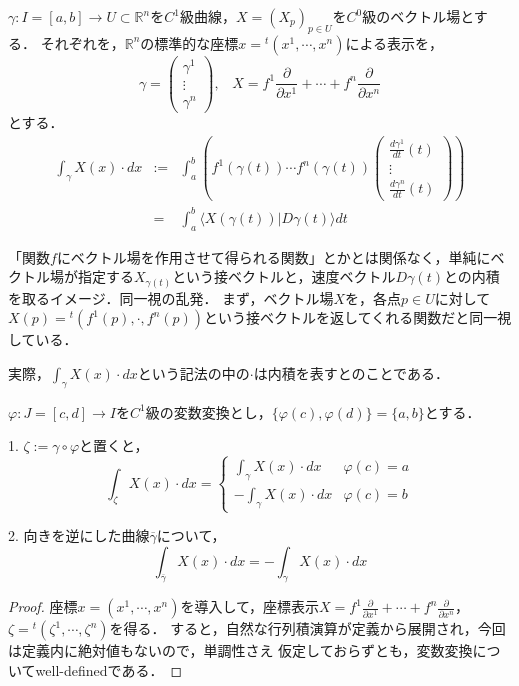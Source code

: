 \documentclass[uplatex, dvipdfmx]{jsreport}
\begin{document}
\begin{shadebox}\begin{definition}
    $\gamma:I=[a,b]\to U\subset\mathbb{R}^n$を$C^1$級曲線，$X=(X_p)_{p\in U}$を$C^0$級のベクトル場とする．
    それぞれを，$\mathbb{R}^n$の標準的な座標$x={}^t(x^1,\cdots,x^n)$による表示を，
    \[ \gamma = \left(\begin{array}{c}\gamma^1 \\ \vdots \\ \gamma^n\end{array}\right), \;\;\; X=f^1\frac{\partial }{\partial x^1}+\cdots +f^n\frac{\partial }{\partial x^n} \]
    とする．
    \begin{eqnarray*}
        \int_\gamma X(x)\cdot dx &:=& \int^b_a \left( f^1(\gamma (t))\cdots f^n(\gamma (t))\left(\begin{array}{c}\frac{d\gamma^1}{dt}(t) \\ \vdots \\ \frac{d\gamma^n}{dt}(t)\end{array}\right) \right) \\
            &=& \int^b_a \langle X(\gamma (t))|D\gamma (t)\rangle dt
    \end{eqnarray*}
\end{definition}\end{shadebox}
\begin{remark}
    「関数$f$にベクトル場を作用させて得られる関数」とかとは関係なく，単純にベクトル場が指定する$X_{\gamma(t)}$という接ベクトルと，速度ベクトル$D\gamma (t)$との内積を取るイメージ．同一視の乱発．
    まず，ベクトル場$X$を，各点$p\in U$に対して$X(p)={}^t(f^1(p),\cdot,f^n(p))$という接ベクトルを返してくれる関数だと同一視している．

    実際，$\int_\gamma X(x)\cdot dx$という記法の中の$\cdot$は内積を表すとのことである．
\end{remark}

\begin{proposition}
    $\varphi :J=[c,d]\to I$を$C^1$級の変数変換とし，$\{\varphi(c),\varphi(d)\}=\{a,b\}$とする．
    
    1. $\zeta := \gamma\circ\varphi$と置くと，
    \[\int_\zeta X(x)\cdot dx =\begin{cases} 
        \int_\gamma X(x)\cdot dx & \varphi (c)=a \\
        -\int_\gamma X(x)\cdot dx & \varphi (c)=b
    \end{cases}\]

    2. 向きを逆にした曲線$\overline{\gamma}$について，
    \[ \int_{\overline{\gamma}}X(x)\cdot dx = - \int_\gamma X(x)\cdot dx \]
\end{proposition}
\begin{proof}
    座標$x=(x^1,\cdots,x^n)$を導入して，座標表示$X=f^1\frac{\partial}{\partial x^1}+\cdots +f^n\frac{\partial}{\partial x^n}$，$\zeta={}^t(\zeta^1,\cdots,\zeta^n)$を得る．
    すると，自然な行列積演算が定義から展開され，今回は定義内に絶対値もないので，単調性さえ
    仮定しておらずとも，変数変換についてwell-definedである．
\end{proof}
\end{document}
